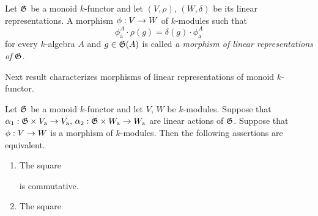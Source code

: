 \begin{definition}
Let ${\mathfrak G}$ be a monoid $k$-functor and let $(V,\rho)$, $(W,\delta)$ be its linear representations. A morphism $\phi:V\rightarrow W$ of $k$-modules such that
$$\phi_{\mathrm{a}}^A \cdot \rho(g) = \delta(g) \cdot \phi_{\mathrm{a}}^A$$
for every $k$-algebra $A$ and $g \in {\mathfrak G}(A)$ is called \textit{a morphism of linear representations of ${\mathfrak G}$}.
\end{definition}
\noindent
Next result characterizes morphisms of linear representations of monoid $k$-functor.

\begin{corollary}\label{corollary:characterization_of_morphisms_of_linear_representations}
Let ${\mathfrak G}$ be a monoid $k$-functor and let $V$, $W$ be $k$-modules. Suppose that $\alpha_1:{\mathfrak G}\times V_{\mathrm{a}} \rightarrow V_{\mathrm{a}},\,\alpha_2:{\mathfrak G}\times W_{\mathrm{a}} \rightarrow W_{\mathrm{a}}$ are linear actions of ${\mathfrak G}$. Suppose that $\phi:V\rightarrow W$ is a morphism of $k$-modules. Then the following assertions are equivalent.
\begin{enumerate}[label=\emph{\textbf{(\roman*)}}, leftmargin=1.5em]
\item The square
\begin{center}
\end{center}
is commutative.
\item The square
\begin{center}
\end{center}
\end{enumerate}
\end{corollary}
